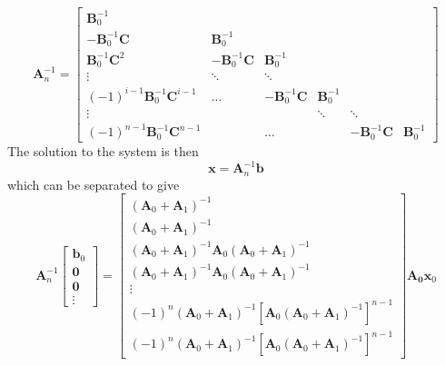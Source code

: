\documentclass[11pt]{article}
\begin{document}
\begin{equation}
\mathbf{A}_{n}^{-1} = \left[ \begin{array}{cccccc}\mathbf{B}_{0}^{-1} & & & & &  \\ -\mathbf{B}_{0}^{-1}\mathbf{C}  & \mathbf{B}_{0}^{-1} & & & & \\  \mathbf{B}_{0}^{-1}\mathbf{C}^2 & -\mathbf{B}_{0}^{-1}\mathbf{C}  &  \mathbf{B}_{0}^{-1} & & & \\ \vdots &  \ddots & \ddots & & & \\  (-1)^{i-1}\mathbf{B}_{0}^{-1}\mathbf{C}^{i-1} & \ldots&   -\mathbf{B}_{0}^{-1}\mathbf{C}& \mathbf{B}_0^{-1}&  & \\ \vdots &  &   & \ddots& \ddots& \\ (-1)^{n-1}\mathbf{B}_{0}^{-1}\mathbf{C}^{n-1} & & \ldots & & -\mathbf{B}_{0}^{-1}\mathbf{C}&\mathbf{B}_0^{-1} \end{array} \right] 
\end{equation} 
The solution to the system is then
\begin{equation}
\mathbf{x} = \mathbf{A}_n^{-1}\mathbf{b}
\end{equation}
which can be separated to give 
\begin{equation}
\mathbf{A}_n^{-1}\left[ \begin{array}{c} \mathbf{b}_0 \\ \mathbf{0} \\ \mathbf{0} \\ \vdots \end{array}\right] = \left[ \begin{array}{c} (\mathbf{A}_0+\mathbf{A}_1)^{-1} \\ (\mathbf{A}_0+\mathbf{A}_1)^{-1}  \\  (\mathbf{A}_0+\mathbf{A}_1)^{-1}\mathbf{A}_0(\mathbf{A}_0+\mathbf{A}_1)^{-1} \\   (\mathbf{A}_0+\mathbf{A}_1)^{-1}\mathbf{A}_0(\mathbf{A}_0+\mathbf{A}_1)^{-1} \\ \vdots  \\  (-1)^n(\mathbf{A}_0+\mathbf{A}_1)^{-1}[\mathbf{A}_0(\mathbf{A}_0+\mathbf{A}_1)^{-1}]^{n-1} \\  (-1)^n(\mathbf{A}_0+\mathbf{A}_1)^{-1}[\mathbf{A}_0(\mathbf{A}_0+\mathbf{A}_1)^{-1}]^{n-1} \end{array}\right]\mathbf{A_0}\mathbf{x}_0
\end{equation}
\end{document}

